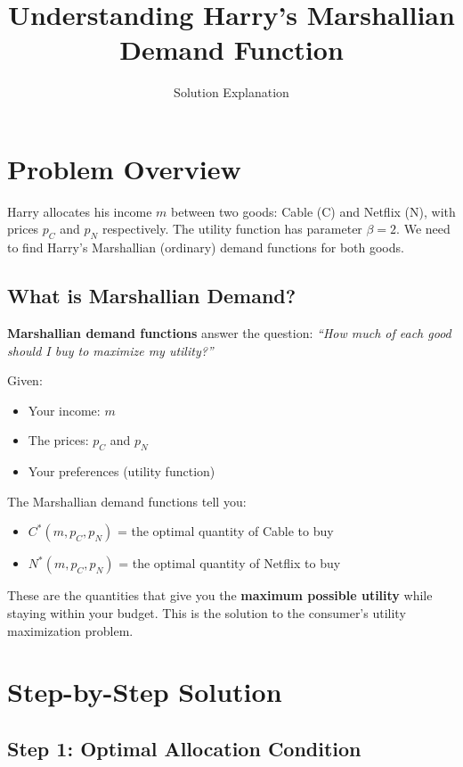 \documentclass[11pt,a4paper]{article}
\title{Understanding Harry's Marshallian Demand Function}
\author{Solution Explanation}
\date{}
\begin{document}
\maketitle

\section{Problem Overview}

Harry allocates his income $m$ between two goods: Cable (C) and Netflix (N), with prices $p_C$ and $p_N$ respectively. The utility function has parameter $\beta = 2$. We need to find Harry's Marshallian (ordinary) demand functions for both goods.

\subsection{What is Marshallian Demand?}

\textbf{Marshallian demand functions} answer the question: \textit{``How much of each good should I buy to maximize my utility?''}

Given:
\begin{itemize}
    \item Your income: $m$
    \item The prices: $p_C$ and $p_N$
    \item Your preferences (utility function)
\end{itemize}

The Marshallian demand functions tell you:
\begin{itemize}
    \item $C^*(m, p_C, p_N)$ = the optimal quantity of Cable to buy
    \item $N^*(m, p_C, p_N)$ = the optimal quantity of Netflix to buy
\end{itemize}

These are the quantities that give you the \textbf{maximum possible utility} while staying within your budget. This is the solution to the consumer's utility maximization problem.

\section{Step-by-Step Solution}

\subsection{Step 1: Optimal Allocation Condition}
\end{document}
